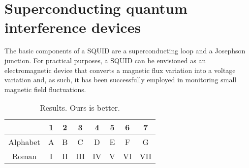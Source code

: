 \documentclass[10pt,twocolumn,letterpaper]{article}
\begin{document}
\section{Superconducting quantum interference devices}
The basic components of a SQUID are a superconducting loop and a Josephson junction. For practical purposes, a SQUID can be envisioned as an electromagnetic device that converts a magnetic flux variation into a voltage variation and, as such, it has been successfully employed in monitoring small magnetic field fluctuations.\cite{Alpher03}\\
\begin{table}
\begin{center}
\begin{tabular}{cccccccc}
\toprule
         & 1 &  2  &   3  &  4  &  5  &  6  & 7 \\
\midrule
Alphabet & A &  B  &   C  &  D  &  E  &  F  & G\\
Roman    & I &  II &  III &  IV &  V  &  VI & VII\\
\bottomrule
\end{tabular}
\end{center}
\caption{Results.   Ours is better.}
\end{table}

\end{document}
